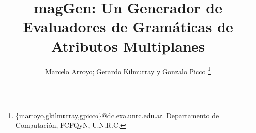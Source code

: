 \documentclass[a4paper]{article}
\begin{document}

\title{magGen: Un Generador de Evaluadores de Gramáticas de Atributos Multiplanes}


%
%
\author{Marcelo Arroyo; Gerardo Kilmurray y Gonzalo Picco%
\footnote{ \{marroyo,gkilmurray,gpicco\}@dc.exa.unrc.edu.ar. Departamento de Computación, FCFQyN, U.N.R.C.}}

\date{}

%


%
%


\maketitle
\end{document}
